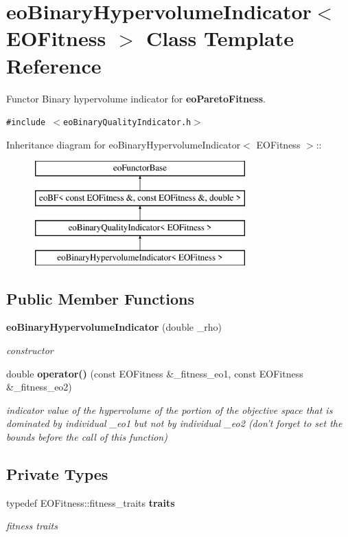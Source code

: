 \section{eo\-Binary\-Hypervolume\-Indicator$<$ EOFitness $>$ Class Template Reference}
\label{classeoBinaryHypervolumeIndicator}
Functor Binary hypervolume indicator for {\bf eo\-Pareto\-Fitness}.  


{\tt \#include $<$eo\-Binary\-Quality\-Indicator.h$>$}

Inheritance diagram for eo\-Binary\-Hypervolume\-Indicator$<$ EOFitness $>$::\begin{figure}[H]
\begin{center}
\leavevmode
\includegraphics[height=4cm]{classeoBinaryHypervolumeIndicator}
\end{center}
\end{figure}
\subsection*{Public Member Functions}
\begin{CompactItemize}
\item 
{\bf eo\-Binary\-Hypervolume\-Indicator} (double \_\-rho)
\begin{CompactList}\small\item\em constructor \item\end{CompactList}\item 
double {\bf operator()} (const EOFitness \&\_\-fitness\_\-eo1, const EOFitness \&\_\-fitness\_\-eo2)
\begin{CompactList}\small\item\em indicator value of the hypervolume of the portion of the objective space that is dominated by individual \_\-eo1 but not by individual \_\-eo2 (don't forget to set the bounds before the call of this function) \item\end{CompactList}\end{CompactItemize}
\subsection*{Private Types}
\begin{CompactItemize}
\item 
typedef EOFitness::fitness\_\-traits {\bf traits}\label{classeoBinaryHypervolumeIndicator_abde225206c55671bd585cc41cbfab1c}

\begin{CompactList}\small\item\em fitness traits \item\end{CompactList}\end{CompactItemize}
